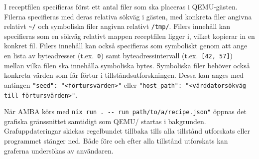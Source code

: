 I receptfilen specifieras först ett antal filer som ska placeras i QEMU-gästen.
Filerna specifieras med deras relativa sökväg i gästen, med konkreta filer
angivna relativt \verb|~/| och symboliska filer angivna relativt \verb|/tmp/|.
Filers innehåll kan specifieras som en sökväg relativt mappen receptfilen ligger
i, vilket kopierar in en konkret fil. Filers innehåll kan också specifieras som
symboliskt genom att ange en lista av byteadresser (t.ex.\ \verb|0|) samt
byteadressintervall (t.ex.\ \verb|[42, 57]|) mellan vilka filen ska innehålla
symboliska bytes. Symboliska filer behöver också konkreta värden som får förtur
i tillståndsutforskningen. Dessa kan anges med antingen
\verb|"seed": "<förtursvärden>"| eller
\verb|"host_path": "<värddatorsökväg till förtursvärden>"|.

När AMBA körs med \lstinline{nix run . -- run path/to/a/recipe.json"} öppnas det
grafiska gränssnittet samtidigt som QEMU/\stoe{} startas i bakgrunden.
Grafuppdateringar skickas regelbundet tillbaka tills alla tillstånd utforskats
eller programmet stänger ned. Både före och efter alla tillstånd utforskats kan
graferna undersökas av användaren.
